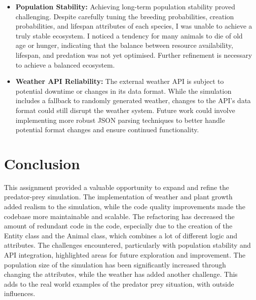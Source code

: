 \documentclass{article}
\begin{document}
\begin{itemize}
    \item \textbf{Population Stability:} Achieving long-term population stability proved challenging. Despite carefully tuning the breeding probabilities, creation probabilities, and lifespan attributes of each species, I was unable to achieve a truly stable ecosystem. I noticed a tendency for many animals to die of old age or hunger, indicating that the balance between resource availability, lifespan, and predation was not yet optimised. Further refinement is necessary to achieve a balanced ecosystem.
    \item \textbf{Weather API Reliability:} The external weather API is subject to potential downtime or changes in its data format. While the simulation includes a fallback to randomly generated weather, changes to the API's data format could still disrupt the weather system. Future work could involve implementing more robust JSON parsing techniques to better handle potential format changes and ensure continued functionality.
\end{itemize}

\section{Conclusion}

This assignment provided a valuable opportunity to expand and refine the predator-prey simulation. The implementation of weather and plant growth added realism to the simulation, while the code quality improvements made the codebase more maintainable and scalable. The refactoring has decreased the amount of redundant code in the code, especially due to the creation of the Entity class and the Animal class, which combines a lot of different logic and attributes. The challenges encountered, particularly with population stability and API integration, highlighted areas for future exploration and improvement. The population size of the simulation has been significantly increased through changing the attributes, while the weather has added another challenge. This adds to the real world examples of the predator prey situation, with outside influences.
\end{document}
